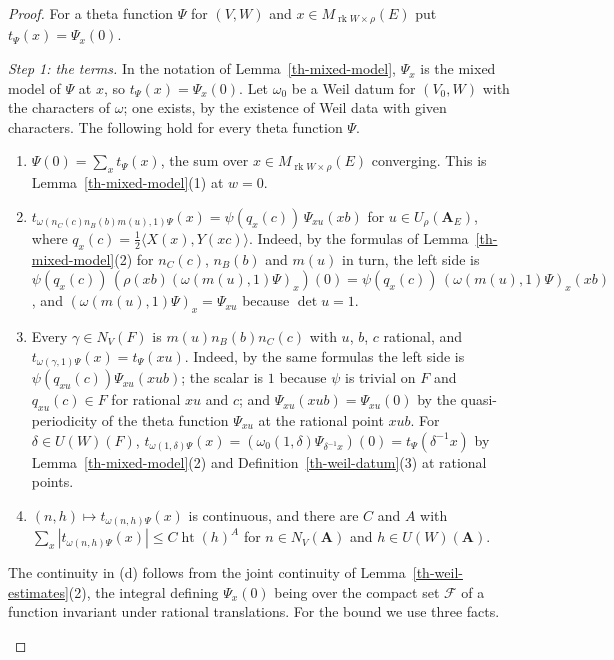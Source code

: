 \begin{proof}
For a theta function $\Psi$ for $(V,W)$ and
$x\in M_{\operatorname{rk}W\times\rho}(E)$ put $t_\Psi(x)=\Psi_x(0)$.

\emph{Step 1: the terms.} In the notation of Lemma~\ref{th-mixed-model},
$\Psi_x$ is the mixed model of $\Psi$ at $x$, so $t_\Psi(x)=\Psi_x(0)$. Let
$\omega_0$ be a Weil datum for $(V_0,W)$ with the characters of $\omega$; one
exists, by the existence of Weil data with given characters. The
following hold for every theta function $\Psi$.
\begin{enumerate}
\item[(a)] $\Psi(0)=\sum_xt_\Psi(x)$, the sum over
  $x\in M_{\operatorname{rk}W\times\rho}(E)$ converging. This is
  Lemma~\ref{th-mixed-model}(1) at $w=0$.
\item[(b)] $t_{\omega(n_C(c)n_B(b)m(u),1)\Psi}(x)=\psi(q_x(c))\,\Psi_{xu}(xb)$
  for $u\in U_\rho(\mathbf A_E)$, where $q_x(c)=\tfrac12\langle X(x),Y(xc)\rangle$.
  Indeed, by the formulas of Lemma~\ref{th-mixed-model}(2) for $n_C(c)$, $n_B(b)$
  and $m(u)$ in turn, the left side is
  $\psi(q_x(c))\,(\rho(xb)(\omega(m(u),1)\Psi)_x)(0)=\psi(q_x(c))\,(\omega(m(u),1)\Psi)_x(xb)$,
  and $(\omega(m(u),1)\Psi)_x=\Psi_{xu}$ because $\det u=1$.
\item[(c)] Every $\gamma\in N_V(F)$ is $m(u)n_B(b)n_C(c)$ with $u$, $b$, $c$
  rational, and $t_{\omega(\gamma,1)\Psi}(x)=t_\Psi(xu)$. Indeed, by the same
  formulas the left side is $\psi(q_{xu}(c))\Psi_{xu}(xub)$; the scalar is $1$
  because $\psi$ is trivial on $F$ and $q_{xu}(c)\in F$ for rational $xu$ and $c$;
  and $\Psi_{xu}(xub)=\Psi_{xu}(0)$ by the quasi-periodicity of the theta
  function $\Psi_{xu}$ at the rational point $xub$. For $\delta\in U(W)(F)$,
  $t_{\omega(1,\delta)\Psi}(x)=(\omega_0(1,\delta)\Psi_{\delta^{-1}x})(0)=t_\Psi(\delta^{-1}x)$
  by Lemma~\ref{th-mixed-model}(2) and Definition~\ref{th-weil-datum}(3) at
  rational points.
\item[(d)] $(n,h)\mapsto t_{\omega(n,h)\Psi}(x)$ is continuous, and there are
  $C$ and $A$ with
  $\sum_x|t_{\omega(n,h)\Psi}(x)|\leq C\operatorname{ht}(h)^A$ for
  $n\in N_V(\mathbf A)$ and $h\in U(W)(\mathbf A)$.
\end{enumerate}
The continuity in (d) follows from the joint continuity of
Lemma~\ref{th-weil-estimates}(2), the integral defining $\Psi_x(0)$ being over
the compact set $\mathcal F$ of a function invariant under rational
translations. For the bound we use three facts.
\begin{enumerate}

\end{enumerate}
\end{proof}
